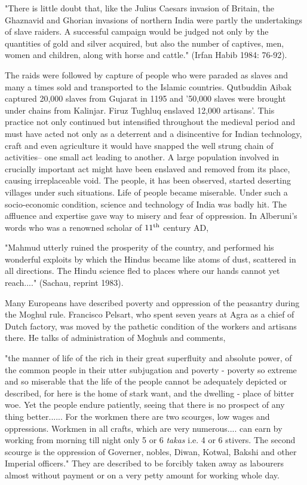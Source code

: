 "There is little doubt that, like the Julius Caesars invasion of Britain, the Ghaznavid and Ghorian invasions of northern India were partly the undertakings of slave raiders. A successful campaign would be judged not only by the quantities of gold and silver acquired, but also the number of captives, men, women and children, along with horse and cattle." (Irfan Habib 1984: 76-92).

The raids were followed by capture of people who were paraded as slaves and many a times sold and transported to the Islamic countries. Qutbuddin Aibak captured 20,000 slaves from Gujarat in 1195 and '50,000 slaves were brought under chains from Kalinjar. Firuz Tughluq enslaved 12,000 artisans'. This practice not only continued but intensified throughout the medieval period and must have acted not only as a deterrent and a disincentive for Indian technology, craft and even agriculture it would have snapped the well strung chain of activities– one small act leading to another. A large population involved in crucially important act might have been enslaved and removed from its place, causing irreplaceable void. The people, it has been observed, started deserting villages under such situations. Life of people became miserable. Under such a socio-economic condition, science and technology of India was badly hit. The affluence and expertise gave way to misery and fear of oppression. In Alberuni's words who was a renowned scholar of $11^{\rm th}$ century AD,

"Mahmud utterly ruined the prosperity of the country, and performed his wonderful exploits by which the Hindus became like atoms of dust, scattered in all directions. The Hindu science fled to places where our hands cannot yet reach...." (Sachau, reprint 1983).

Many Europeans have described poverty and oppression of the peasantry during the Moghul rule.  Francisco Pelsart, who spent seven years at Agra as a chief of Dutch factory, was moved by the pathetic condition of the workers and artisans there. He talks of administration of Moghuls and comments,

"the manner of life of the rich in their great superfluity and absolute power, of the common people in their utter subjugation and poverty - poverty so extreme and so miserable that the life of the people cannot be adequately depicted or described, for here is the home of stark want, and the dwelling - place of bitter woe.  Yet the people endure patiently, seeing that there is no prospect of any thing better......  For the workmen there are two scourges, low wages and oppressions.  Workmen in all crafts, which are very numerous.... can earn by working from morning till night only 5 or 6 {\it takas} i.e. 4 or 6 stivers.  The second scourge is the oppression of Governer, nobles, Diwan, Kotwal, Bakshi and other Imperial officers."  They are described to be forcibly taken away as labourers almost without payment or on a very petty amount for working whole day.

